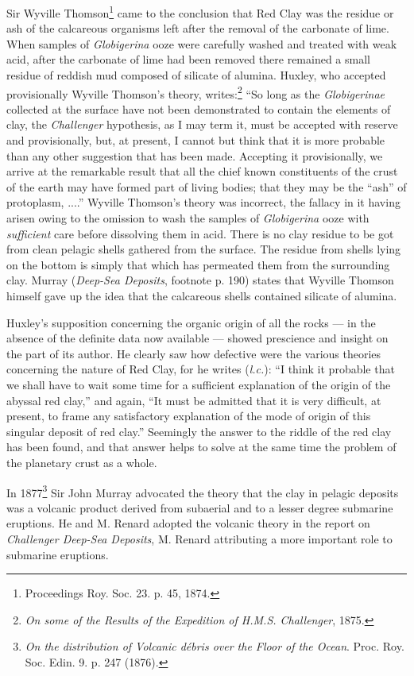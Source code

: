\documentclass[a4paper, 12pt, oneside]{article}
\begin{document}
Sir Wyville Thomson\footnote{Proceedings Roy. Soc. 23. p. 45, 1874.} came to the conclusion that Red Clay was the residue or ash of the calcareous organisms left after the removal of the carbonate of lime. When samples of \emph{Globigerina} ooze were carefully washed and treated with weak acid, after the carbonate of lime had been removed there remained a small residue of reddish mud composed of silicate of alumina. Huxley, who accepted provisionally Wyville Thomson's theory, writes:\footnote{\emph{On some of the Results of the Expedition of H.M.S. Challenger}, 1875.} ``So long as the \emph{Globigerinae} collected at the surface have not been demonstrated to contain the elements of clay, the \emph{Challenger} hypothesis, as I may term it, must be accepted with reserve and provisionally, but, at present, I cannot but think that it is more probable than any other suggestion that has been made. Accepting it provisionally, we arrive at the remarkable result that all the chief known constituents of the crust of the earth may have formed part of living bodies; that they may be the ``ash'' of protoplasm, ....'' Wyville Thomson's theory was incorrect, the fallacy in it having arisen owing to the omission to wash the samples of \emph{Globigerina} ooze with \emph{sufficient} care before dissolving them in acid. There is no clay residue to be got from clean pelagic shells gathered from the surface. The residue from shells lying on the bottom is simply that which has permeated them from the surrounding clay. Murray (\emph{Deep-Sea Deposits}, footnote p. 190) states that Wyville Thomson himself gave up the idea that the calcareous shells contained silicate of alumina.

Huxley's supposition concerning the organic origin of all the rocks --- in the absence of the definite data now available --- showed prescience and insight on the part of its author. He clearly saw how defective were the various theories concerning the nature of Red Clay, for he writes (\emph{l.c.}): ``I think it probable that we shall have to wait some time for a sufficient explanation of the origin of the abyssal red clay,'' and again, ``It must be admitted that it is very difficult, at present, to frame any satisfactory explanation of the mode of origin of this singular deposit of red clay.'' Seemingly the answer to the riddle of the red clay has been found, and that answer helps to solve at the same time the problem of the planetary crust as a whole.

In 1877\footnote{\emph{On the distribution of Volcanic débris over the Floor of the Ocean}. Proc. Roy. Soc. Edin. 9. p. 247 (1876).} Sir John Murray advocated the theory that the clay in pelagic deposits was a volcanic product derived from subaerial and to a lesser degree submarine eruptions. He and M. Renard adopted the volcanic theory in the report on \emph{Challenger Deep-Sea Deposits}, M. Renard attributing a more important role to submarine eruptions.
\end{document}

